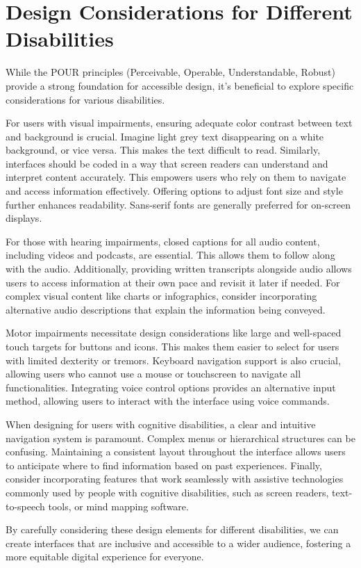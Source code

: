 \section{Design Considerations for Different Disabilities}

While the POUR principles (Perceivable, Operable, Understandable, Robust)
provide a strong foundation for accessible design, it's beneficial to explore
specific considerations for various disabilities.

For users with visual impairments, ensuring adequate color contrast between text
and background is crucial. Imagine light grey text disappearing on a white
background, or vice versa.  This makes the text difficult to read.  Similarly,
interfaces should be coded in a way that screen readers can understand and
interpret content accurately. This empowers users who rely on them to navigate
and access information effectively. Offering options to adjust font size and
style further enhances readability. Sans-serif fonts are generally preferred for
on-screen displays.

For those with hearing impairments, closed captions for all audio content,
including videos and podcasts, are essential. This allows them to follow along
with the audio. Additionally, providing written transcripts alongside audio
allows users to access information at their own pace and revisit it later if
needed.  For complex visual content like charts or infographics, consider
incorporating alternative audio descriptions that explain the information being
conveyed.

Motor impairments necessitate design considerations like large and well-spaced
touch targets for buttons and icons. This makes them easier to select for users
with limited dexterity or tremors. Keyboard navigation support is also crucial,
allowing users who cannot use a mouse or touchscreen to navigate all
functionalities. Integrating voice control options provides an alternative
input method, allowing users to interact with the interface using voice
commands.

When designing for users with cognitive disabilities, a clear and intuitive
navigation system is paramount. Complex menus or hierarchical structures can be
confusing.  Maintaining a consistent layout throughout the interface allows
users to anticipate where to find information based on past experiences. 
Finally, consider incorporating features that work seamlessly with assistive
technologies commonly used by people with cognitive disabilities, such as screen
readers, text-to-speech tools, or mind mapping software.

By carefully considering these design elements for different disabilities, we
can create interfaces that are inclusive and accessible to a wider audience,
fostering a more equitable digital experience for everyone.
